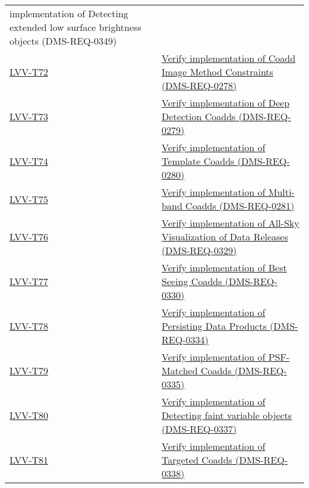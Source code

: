 \begin{longtable}[]{p{3cm}p{13cm}}
{implementation of Detecting extended low surface brightness objects
(DMS-REQ-0349)}\tabularnewline
\protect\hyperlink{lvv-t72---verify-implementation-of-coadd-image-method-constraints-dms-req-0278}{LVV-T72}
&
\href{https://jira.lsstcorp.org/secure/Tests.jspa\#/testCase/LVV-T72}{Verify
implementation of Coadd Image Method Constraints
(DMS-REQ-0278)}\tabularnewline
\protect\hyperlink{lvv-t73---verify-implementation-of-deep-detection-coadds-dms-req-0279}{LVV-T73}
&
\href{https://jira.lsstcorp.org/secure/Tests.jspa\#/testCase/LVV-T73}{Verify
implementation of Deep Detection Coadds (DMS-REQ-0279)}\tabularnewline
\protect\hyperlink{lvv-t74---verify-implementation-of-template-coadds-dms-req-0280}{LVV-T74}
&
\href{https://jira.lsstcorp.org/secure/Tests.jspa\#/testCase/LVV-T74}{Verify
implementation of Template Coadds (DMS-REQ-0280)}\tabularnewline
\protect\hyperlink{lvv-t75---verify-implementation-of-multi-band-coadds-dms-req-0281}{LVV-T75}
&
\href{https://jira.lsstcorp.org/secure/Tests.jspa\#/testCase/LVV-T75}{Verify
implementation of Multi-band Coadds (DMS-REQ-0281)}\tabularnewline
\protect\hyperlink{lvv-t76---verify-implementation-of-all-sky-visualization-of-data-releases-dms-req-0329}{LVV-T76}
&
\href{https://jira.lsstcorp.org/secure/Tests.jspa\#/testCase/LVV-T76}{Verify
implementation of All-Sky Visualization of Data Releases
(DMS-REQ-0329)}\tabularnewline
\protect\hyperlink{lvv-t77---verify-implementation-of-best-seeing-coadds-dms-req-0330}{LVV-T77}
&
\href{https://jira.lsstcorp.org/secure/Tests.jspa\#/testCase/LVV-T77}{Verify
implementation of Best Seeing Coadds (DMS-REQ-0330)}\tabularnewline
\protect\hyperlink{lvv-t78---verify-implementation-of-persisting-data-products-dms-req-0334}{LVV-T78}
&
\href{https://jira.lsstcorp.org/secure/Tests.jspa\#/testCase/LVV-T78}{Verify
implementation of Persisting Data Products
(DMS-REQ-0334)}\tabularnewline
\protect\hyperlink{lvv-t79---verify-implementation-of-psf-matched-coadds-dms-req-0335}{LVV-T79}
&
\href{https://jira.lsstcorp.org/secure/Tests.jspa\#/testCase/LVV-T79}{Verify
implementation of PSF-Matched Coadds (DMS-REQ-0335)}\tabularnewline
\protect\hyperlink{lvv-t80---verify-implementation-of-detecting-faint-variable-objects-dms-req-0337}{LVV-T80}
&
\href{https://jira.lsstcorp.org/secure/Tests.jspa\#/testCase/LVV-T80}{Verify
implementation of Detecting faint variable objects
(DMS-REQ-0337)}\tabularnewline
\protect\hyperlink{lvv-t81---verify-implementation-of-targeted-coadds-dms-req-0338}{LVV-T81}
&
\href{https://jira.lsstcorp.org/secure/Tests.jspa\#/testCase/LVV-T81}{Verify
implementation of Targeted Coadds (DMS-REQ-0338)}\tabularnewline

\end{longtable}
